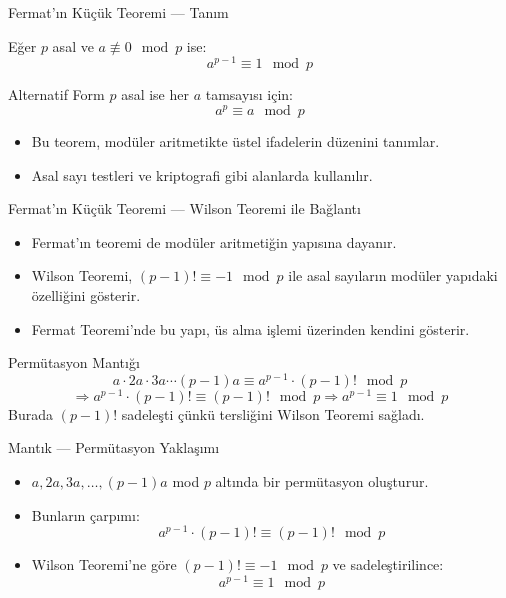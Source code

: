 \documentclass{beamer}
\begin{document}
\begin{frame}{Fermat'ın Küçük Teoremi — Tanım}
  \begin{theorem}
    Eğer $p$ asal ve $a \not\equiv 0 \mod p$ ise:
    \[
      a^{p - 1} \equiv 1 \mod p
    \]
  \end{theorem}
  
  \begin{block}{Alternatif Form}
    $p$ asal ise her $a$ tamsayısı için:
    \[
      a^p \equiv a \mod p
    \]
  \end{block}
  
  \begin{itemize}
    \item Bu teorem, modüler aritmetikte üstel ifadelerin düzenini tanımlar.
    \item Asal sayı testleri ve kriptografi gibi alanlarda kullanılır.
  \end{itemize}
\end{frame}


\begin{frame}{Fermat'ın Küçük Teoremi — Wilson Teoremi ile Bağlantı}
  \begin{itemize}
    \item Fermat'ın teoremi de modüler aritmetiğin yapısına dayanır.
    \item Wilson Teoremi, $(p-1)! \equiv -1 \mod p$ ile asal sayıların modüler yapıdaki özelliğini gösterir.
    \item Fermat Teoremi'nde bu yapı, üs alma işlemi üzerinden kendini gösterir.
  \end{itemize}

  \begin{exampleblock}{Permütasyon Mantığı}
    \[
      a \cdot 2a \cdot 3a \cdots (p-1)a \equiv a^{p-1} \cdot (p-1)! \mod p
    \]
    \[
      \Rightarrow a^{p - 1} \cdot (p - 1)! \equiv (p - 1)! \mod p \Rightarrow a^{p-1} \equiv 1 \mod p
    \]
    Burada $(p-1)!$ sadeleşti çünkü tersliğini Wilson Teoremi sağladı.
  \end{exampleblock}
\end{frame}

\begin{frame}{Mantık — Permütasyon Yaklaşımı}
  \begin{itemize}
    \item $a, 2a, 3a, \dotsc, (p-1)a$ mod $p$ altında bir permütasyon oluşturur.
    \item Bunların çarpımı:
    \[
      a^{p - 1} \cdot (p - 1)! \equiv (p - 1)! \mod p
    \]
    \item Wilson Teoremi'ne göre $(p-1)! \equiv -1 \mod p$ ve sadeleştirilince:
    \[
      a^{p - 1} \equiv 1 \mod p
    \]
  \end{itemize}
\end{frame}
\end{document}
